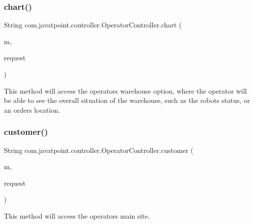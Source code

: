\subsubsection{\texorpdfstring{chart()}{chart()}}
{\footnotesize\ttfamily String com.\+javatpoint.\+controller.\+Operator\+Controller.\+chart (\begin{DoxyParamCaption}\item[{Model}]{m,  }\item[{Web\+Request}]{request }\end{DoxyParamCaption})\hspace{0.3cm}{\ttfamily [inline]}}

This method will access the operator\textquotesingle{}s \textquotesingle{}warehouse\textquotesingle{} option, where the operator will be able to see the overall situation of the warehouse, such as the robots\textquotesingle{} status, or an order\textquotesingle{}s location. \mbox{\label{classcom_1_1javatpoint_1_1controller_1_1_operator_controller_ae72c04d6241d916e7ebcfce5ba4d5390}} 
\subsubsection{\texorpdfstring{customer()}{customer()}}
{\footnotesize\ttfamily String com.\+javatpoint.\+controller.\+Operator\+Controller.\+customer (\begin{DoxyParamCaption}\item[{Model}]{m,  }\item[{Web\+Request}]{request }\end{DoxyParamCaption})\hspace{0.3cm}{\ttfamily [inline]}}

This method will access the operator\textquotesingle{}s main site. \mbox{\label{classcom_1_1javatpoint_1_1controller_1_1_operator_controller_aa55117789c24f6dd8cbebf27c6e886ea}} 
